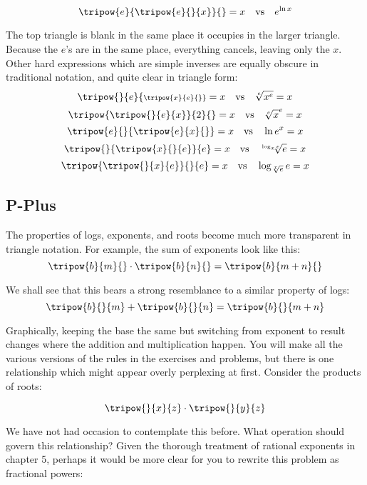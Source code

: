 \begin{equation}
\tripow{e}{ \tripow{e}{}{x}}{}=x \quad \text{vs} \quad e^{\ln{x}}
\end{equation}

The top triangle is blank in the same place it occupies in the larger triangle.  Because the
$e$'s are in the same place, everything cancels, leaving only the $x$.  
Other hard expressions which are simple inverses are equally obscure in traditional notation,
and quite clear in triangle form:
\begin{equation}
\tripow{}{e}{\scriptstyle \tripow{x}{e}{}} = x \quad \text{vs} \quad \sqrt[e]{x^e} = x
\end{equation}
\begin{equation}
\tripow{\tripow{}{e}{x}}{2}{} = x \quad \text{vs} \quad \sqrt[e]{x}^e = x
\end{equation}
\begin{equation}
\tripow{e}{}{\tripow{e}{x}{}} = x \quad \text{vs} \quad \ln{e^x} = x
\end{equation}
\begin{equation}
\tripow{}{\tripow{x}{}{e}}{e} = x \quad \text{vs} \quad \sqrt[\log_x{e}]{e} = x
\end{equation}
\begin{equation}\tripow{\tripow{}{x}{e}}{}{e} = x \quad \text{vs} \quad \log_{\sqrt[x]{e}}{e} = x
\end{equation}


\subsection{P-Plus}
The properties of logs, exponents, and roots become much more transparent in triangle notation.
For example, the sum of exponents look like this:
$$\tripow{b}{m}{}\cdot{}\tripow{b}{n}{}=\tripow{b}{m+n}{}$$

We shall see that this bears a strong resemblance to a similar property of logs:
$$\tripow{b}{}{m} + \tripow{b}{}{n} = \tripow{b}{}{m+n}$$

Graphically, keeping the base the same but switching from exponent to result changes where
the addition and multiplication happen.  You will make all the various versions of the rules in the
exercises and problems, but there is one relationship which might appear overly perplexing at first.
Consider the products of roots:

$$
\tripow{}{x}{z} \cdot{} \tripow{}{y}{z}
$$

We have not had occasion to contemplate this before.  What operation should govern this 
relationship?  Given the thorough treatment of rational exponents in chapter 5, perhaps it would
be more clear for you to rewrite this problem as fractional powers:

